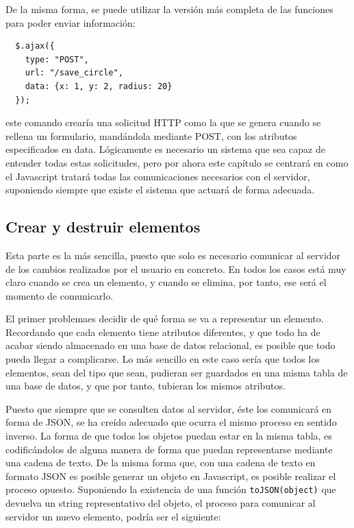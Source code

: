 De la misma forma, se puede utilizar la versión más completa de las funciones para poder enviar información:

\begin{verbatim}
  $.ajax({
    type: "POST",
    url: "/save_circle",
    data: {x: 1, y: 2, radius: 20}
  });
\end{verbatim} 

este comando crearía una solicitud HTTP como la que se genera cuando se rellena un formulario, mandándola mediante POST, con los atributos especificados en data. Lógicamente es necesario un sistema que sea capaz de entender todas estas solicitudes, pero por ahora este capítulo se centrará en como el Javascript tratará todas las comunicaciones necesarios con el servidor, suponiendo siempre que existe el sistema que actuará de forma adecuada.

\newpage
\subsection{Crear y destruir elementos} %
\label{ssub:crear_y_destruir_elementos}

Esta parte es la más sencilla, puesto que solo es necesario comunicar al servidor de los cambios realizados por el usuario en concreto. En todos los casos está muy claro cuando se crea un elemento, y cuando se elimina, por tanto, ese será el momento de comunicarlo. 

El primer problemaes decidir de qué forma se va a representar un elemento. Recordando que cada elemento tiene atributos diferentes, y que todo ha de acabar siendo almacenado en una base de datos relacional, es posible que todo pueda llegar a complicarse. Lo más sencillo en este caso sería que todos los elementos, sean del tipo que sean, pudieran ser guardados en una misma tabla de una base de datos, y que por tanto, tubieran los mismos atributos.

Puesto que siempre que se consulten datos al servidor, éste los comunicará en forma de JSON, se ha creído adecuado que ocurra el mismo proceso en sentido inverso. La forma de que todos los objetos puedan estar en la misma tabla, es codificándolos de alguna manera de forma que puedan representarse mediante una cadena de texto. De la misma forma que, con una cadena de texto en formato JSON es posible generar un objeto en Javascript, es posible realizar el proceso opuesto. Suponiendo la existencia de una función \texttt{toJSON(object)} que devuelva un string representativo del objeto, el proceso para comunicar al servidor un nuevo elemento, podría ser el siguiente:

